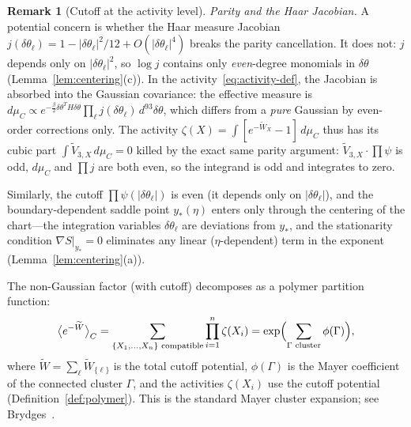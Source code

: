 \documentclass[11pt]{article}
\theoremstyle{definition}
\newtheorem{remark}[theorem]{Remark}
\begin{document}
\begin{remark}[Cutoff at the activity level]
\emph{Parity and the Haar Jacobian.}
A potential concern is whether the Haar measure Jacobian
$j(\delta\theta_\ell)=1-|\delta\theta_\ell|^2/12+O(|\delta\theta_\ell|^4)$
breaks the parity cancellation.  It does not: $j$ depends only on
$|\delta\theta_\ell|^2$, so $\log j$ contains only \emph{even}-degree
monomials in $\delta\theta$ (Lemma~\ref{lem:centering}(c)).  In the
activity~\eqref{eq:activity-def}, the Jacobian is absorbed into the
Gaussian covariance: the effective measure is $d\mu_C\propto
e^{-\frac{\beta}{2}\delta\theta^T H\delta\theta}\prod_\ell
j(\delta\theta_\ell)\,d^{93}\delta\theta$, which differs from a
\emph{pure} Gaussian by even-order corrections only.
The activity $\zeta(X)=\int[e^{-\widetilde{W}_X}-1]\,d\mu_C$ thus
has its cubic part $\int\widetilde{V}_{3,X}\,d\mu_C=0$ killed by the
exact same parity argument: $\widetilde{V}_{3,X}\cdot\prod\psi$ is
odd, $d\mu_C$ and $\prod j$ are both even, so the integrand is odd
and integrates to zero.

Similarly, the cutoff $\prod\psi(|\delta\theta_\ell|)$ is even
(it depends only on $|\delta\theta_\ell|$), and the boundary-dependent
saddle point $y_*(\eta)$ enters only through the centering of the
chart---the integration variables $\delta\theta_\ell$ are deviations
from $y_*$, and the stationarity condition $\nabla S|_{y_*}=0$
eliminates any linear ($\eta$-dependent) term in the exponent
(Lemma~\ref{lem:centering}(a)).
\end{remark}

The non-Gaussian factor (with cutoff) decomposes as a polymer
partition function:
\begin{equation}\label{eq:polymer-Z}
\bigl\langle e^{-\widetilde{W}}\bigr\rangle_C
=\sum_{\{X_1,\ldots,X_n\}\text{ compatible}}
\prod_{i=1}^n\zeta(X_i)
=\exp\Bigl(\sum_{\Gamma\text{ cluster}}\phi(\Gamma)\Bigr),
\end{equation}
where $\widetilde{W}=\sum_\ell\widetilde{W}_{\{\ell\}}$ is the total
cutoff potential, $\phi(\Gamma)$ is the Mayer coefficient of the
connected cluster $\Gamma$, and the activities $\zeta(X_i)$ use
the cutoff potential (Definition~\ref{def:polymer}).  This is the
standard Mayer cluster expansion; see Brydges~\cite{Brydges86}.
\end{document}
